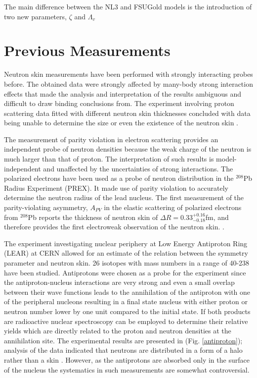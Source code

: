 \indent The main difference between the NL3 and FSUGold models is the introduction of two new parameters, $\zeta$ and $\Lambda_{v}$

\section{Previous Measurements}

\indent Neutron skin measurements have been performed with strongly interacting probes before. The obtained data were strongly affected by many-body strong interaction effects that made the analysis and interpretation of the results ambiguous and difficult to draw binding conclusions from. The experiment involving proton scattering data fitted with different neutron skin thicknesses concluded with data being unable to determine the size or even the existence of the neutron skin \cite{piek}.

\indent The measurement of parity violation in electron scattering provides an independent probe of neutron densities because the weak charge of the neutron is much larger than that of proton. The interpretation of such results is model-independent and unaffected by the uncertainties of strong interactions. The polarized electrons have been used as a probe of neutron distribution in the $^{208}$Pb Radius Experiment (PREX). It made use of parity violation to accurately determine the neutron radius of the lead nucleus. The first measurement of the parity-violating asymmetry, $A_{PV}$ in the elastic scattering of polarized electrons from $^{208}$Pb reports the thickness of neutron skin of $\Delta R = 0.33_{-0.18}^{+0.16}$fm, and therefore provides the first electroweak observation of the neutron skin. \cite{prex}.

\indent The experiment investigating nuclear periphery at Low Energy Antiproton Ring (LEAR) at CERN allowed for an estimate of the relation between the symmetry parameter and neutron skin. 26 isotopes with mass numbers in a range of 40-238 have been studied. Antiprotons were chosen as a probe for the experiment since the antiproton-nucleus interactions are very strong and even a small overlap between their wave functions leads to the annihilation of the antiproton with one of the peripheral nucleons resulting in a final state nucleus with either proton or neutron number lower by one unit compared to the initial state. If both products are radioactive nuclear spectroscopy can be employed to determine their relative yields which are directly related to the proton and neutron densities at the annihilation site. The experimental results are presented in (Fig. \ref{antiproton}); analysis of the data indicated that neutrons are distributed in a form of a halo rather than a skin \cite{trzcina}. However, as the antiprotons are absorbed only in the surface of the nucleus the systematics in such measurements are somewhat controversial.

